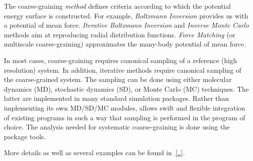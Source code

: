 The coarse-graining {\em method} defines criteria according to which the potential energy surface is constructed. For example, {\em Boltzmann Inversion} provides us with a potential of mean force. {\em Iterative Boltzmann Inversion} and {\em Inverse Monte Carlo} methods aim at reproducing radial distribution functions. {\em Force Matching} (or multiscale coarse-graining) approximates the many-body potential of mean force.

In most cases, coarse-graining requires canonical sampling of a reference (high resolution) system. In addition, iterative methods require canonical sampling of the coarse-grained system. The sampling can be done using either molecular dynamics (MD), stochastic dynamics (SD), or Monte Carlo (MC) techniques. The latter are implemented in many standard simulation packages. Rather than implementing its own MD/SD/MC modules, \votca allows swift and flexible integration of existing  programs in such a way that sampling is performed in the program of choice. The analysis needed for systematic coarse-graining is done using the package tools.

More details as well as several examples can be found in~\ref{..}.
